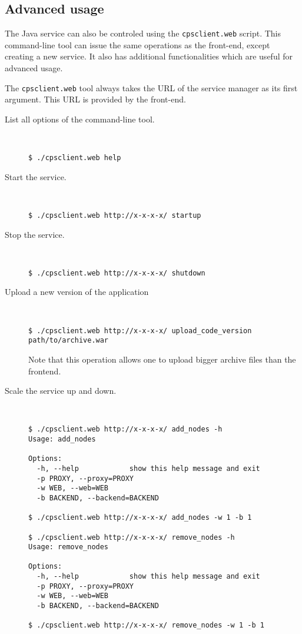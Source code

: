 \documentclass[10pt]{article}
\begin{document}
\subsection{Advanced usage}

The Java service can also be controled using the \texttt{cpsclient.web}
script. This command-line tool can issue the same operations as the
front-end, except creating a new service. It also has additional
functionalities which are useful for advanced usage.

The \texttt{cpsclient.web} tool always takes the URL of the service
manager as its first argument. This URL is provided by the front-end.

\begin{description}
\item[List all options of the command-line tool.]~
\begin{verbatim}
$ ./cpsclient.web help
\end{verbatim}

\item[Start the service.]~
\begin{verbatim}
$ ./cpsclient.web http://x-x-x-x/ startup
\end{verbatim}

\item[Stop the service.]~
\begin{verbatim}
$ ./cpsclient.web http://x-x-x-x/ shutdown
\end{verbatim}

\item[Upload a new version of the application]~
\begin{verbatim}
$ ./cpsclient.web http://x-x-x-x/ upload_code_version path/to/archive.war
\end{verbatim}
Note that this operation allows one to upload bigger archive files than the frontend.

\item[Scale the service up and down.]~
\begin{verbatim}
$ ./cpsclient.web http://x-x-x-x/ add_nodes -h
Usage: add_nodes

Options:
  -h, --help            show this help message and exit
  -p PROXY, --proxy=PROXY
  -w WEB, --web=WEB     
  -b BACKEND, --backend=BACKEND

$ ./cpsclient.web http://x-x-x-x/ add_nodes -w 1 -b 1

$ ./cpsclient.web http://x-x-x-x/ remove_nodes -h
Usage: remove_nodes

Options:
  -h, --help            show this help message and exit
  -p PROXY, --proxy=PROXY
  -w WEB, --web=WEB     
  -b BACKEND, --backend=BACKEND

$ ./cpsclient.web http://x-x-x-x/ remove_nodes -w 1 -b 1
\end{verbatim}
\end{description}
\end{document}
